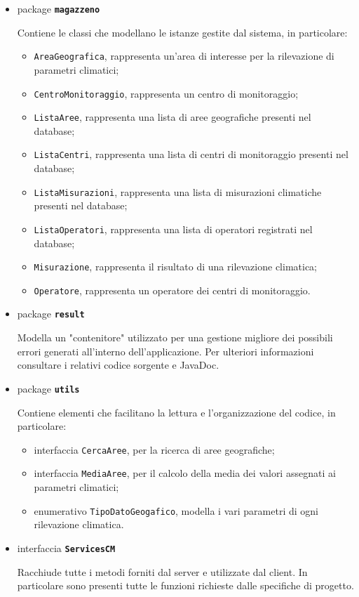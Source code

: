 \begin{itemize}
	\item package \textbf{\texttt{magazzeno}}
		
		Contiene le classi che modellano le istanze gestite dal sistema, in particolare:
		\begin{itemize}
			\item \texttt{AreaGeografica}, rappresenta un'area di interesse per la rilevazione di parametri climatici;
			\item \texttt{CentroMonitoraggio}, rappresenta un centro di monitoraggio;
			\item \texttt{ListaAree}, rappresenta una lista di aree geografiche presenti nel database;
			\item \texttt{ListaCentri}, rappresenta una lista di centri di monitoraggio presenti nel database;
			\item \texttt{ListaMisurazioni}, rappresenta una lista di misurazioni climatiche presenti nel database;
			\item \texttt{ListaOperatori}, rappresenta una lista di operatori registrati nel database;
			\item \texttt{Misurazione}, rappresenta il risultato di una rilevazione climatica;
			\item \texttt{Operatore}, rappresenta un operatore dei centri di monitoraggio.
		\end{itemize}
	\item package \textbf{\texttt{result}}
		
		Modella un "contenitore" utilizzato per una gestione migliore dei possibili errori generati all'interno dell'applicazione.
		Per ulteriori informazioni consultare i relativi codice sorgente e JavaDoc.
	\item package \textbf{\texttt{utils}}
		
		Contiene elementi che facilitano la lettura e l'organizzazione del codice, in particolare:
		\begin{itemize}
			\item interfaccia \texttt{CercaAree}, per la ricerca di aree geografiche;
			\item interfaccia \texttt{MediaAree}, per il calcolo della media dei valori assegnati ai parametri climatici;
			\item enumerativo \texttt{TipoDatoGeogafico}, modella i vari parametri di ogni rilevazione climatica.
		\end{itemize}
	\item interfaccia \textbf{\texttt{ServicesCM}}
	
		Racchiude tutte i metodi forniti dal server e utilizzate dal client. In particolare sono presenti tutte le funzioni richieste dalle specifiche di progetto.
\end{itemize}

